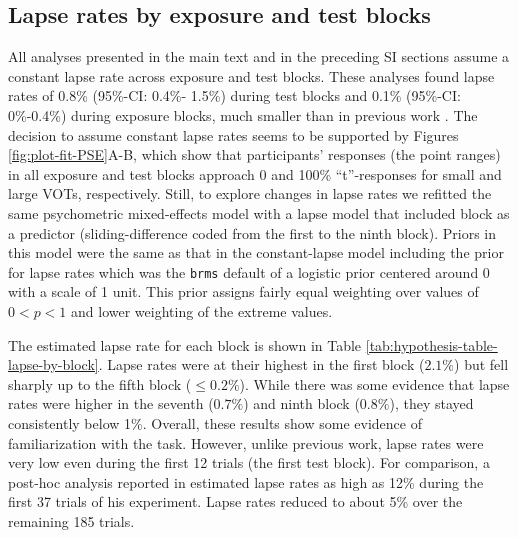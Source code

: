 \documentclass[
  11pt,
  man,mask,floatsintext]{apa6}
\begin{document}
\pagebreak

\subsection{Lapse rates by exposure and test blocks}\label{sec:analysis-lapse}

All analyses presented in the main text and in the preceding SI sections assume a constant lapse rate across exposure and test blocks. These analyses found lapse rates of 0.8\% (95\%-CI: 0.4\%- 1.5\%) during test blocks and 0.1\% (95\%-CI: 0\%-0.4\%) during exposure blocks, much smaller than in previous work \autocite{clayards2008,kleinschmidt-jaeger2016,kleinschmidt2020}. The decision to assume constant lapse rates seems to be supported by Figures \ref{fig:plot-fit-PSE}A-B, which show that participants' responses (the point ranges) in all exposure and test blocks approach 0 and 100\% ``t''-responses for small and large VOTs, respectively. Still, to explore changes in lapse rates we refitted the same psychometric mixed-effects model with a lapse model that included block as a predictor (sliding-difference coded from the first to the ninth block). Priors in this model were the same as that in the constant-lapse model including the prior for lapse rates which was the \texttt{brms} \autocite{R-brms_a} default of a logistic prior centered around 0 with a scale of 1 unit. This prior assigns fairly equal weighting over values of \(0 < p < 1\) and lower weighting of the extreme values.

The estimated lapse rate for each block is shown in Table \ref{tab:hypothesis-table-lapse-by-block}. Lapse rates were at their highest in the first block (\(2.1\%\)) but fell sharply up to the fifth block (\(\leq 0.2\%\)). While there was some evidence that lapse rates were higher in the seventh (\(0.7\%\)) and ninth block (\(0.8\%\)), they stayed consistently below 1\%. Overall, these results show some evidence of familiarization with the task. However, unlike previous work, lapse rates were very low even during the first 12 trials (the first test block). For comparison, a post-hoc analysis reported in \textcite{kleinschmidt2020} estimated lapse rates as high as 12\% during the first 37 trials of his experiment. Lapse rates reduced to about 5\% over the remaining 185 trials.
\end{document}
